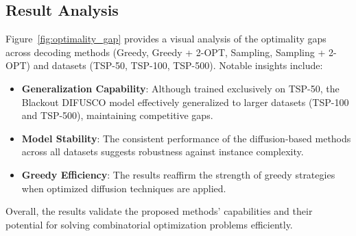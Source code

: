 \subsection{Result Analysis}
Figure~\ref{fig:optimality_gap} provides a visual analysis of the optimality gaps across decoding methods (Greedy, Greedy + 2-OPT, Sampling, Sampling + 2-OPT) and datasets (TSP-50, TSP-100, TSP-500). Notable insights include:
\begin{itemize}
    \item \textbf{Generalization Capability}: Although trained exclusively on TSP-50, the Blackout DIFUSCO model effectively generalized to larger datasets (TSP-100 and TSP-500), maintaining competitive gaps.
    \item \textbf{Model Stability}: The consistent performance of the diffusion-based methods across all datasets suggests robustness against instance complexity.
    \item \textbf{Greedy Efficiency}: The results reaffirm the strength of greedy strategies when optimized diffusion techniques are applied.
\end{itemize}

Overall, the results validate the proposed methods' capabilities and their potential for solving combinatorial optimization problems efficiently.
